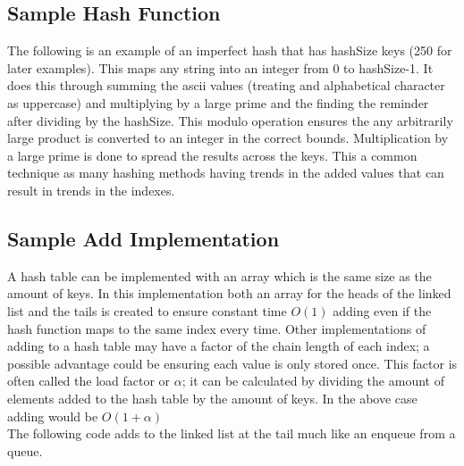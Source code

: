 \documentclass[letterpaper, 10pt]{article}
\begin{document}
\subsection{Sample Hash Function}
The following is an example of an imperfect hash that has hashSize keys (250 for later examples). This maps any string
into an integer from 0 to hashSize-1. It does this through summing the ascii values (treating and alphabetical character as uppercase)
and multiplying by a large prime and the finding the reminder after dividing by the hashSize. This modulo operation ensures the any arbitrarily
large product is converted to an integer in the correct bounds. Multiplication by a large prime is done to spread the results across the keys.
This a common technique as many hashing methods having trends in the added values that can result in trends in the indexes.
\subsection{Sample Add Implementation}
A hash table can be implemented with an array which is the same size as the amount of keys. In this implementation
both an array for the heads of the linked list and the tails is created to ensure constant time $O(1)$ adding even if
the hash function maps to the same index every time. Other implementations of adding to a hash table may have a 
factor of the chain length of each index; a possible advantage could be ensuring each value is only stored once.
This factor is often called the load factor or $\alpha$; it can
be calculated by dividing the amount of elements added to the hash table by the amount of keys.
In the above case adding would be $O(1 + \alpha)$ \\
\newline
\noindent
The following code adds to the linked list at the tail much like an enqueue from a queue.
\end{document}
